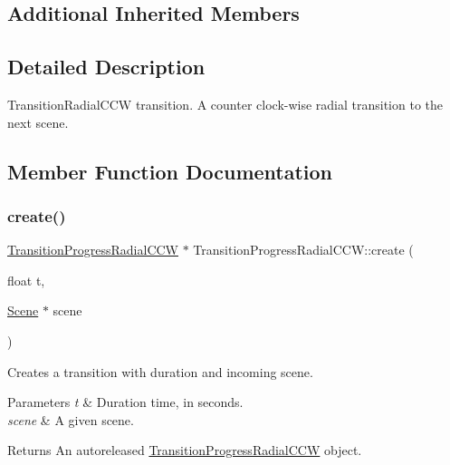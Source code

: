 \subsection*{Additional Inherited Members}


\subsection{Detailed Description}
Transition\+Radial\+C\+CW transition. A counter clock-\/wise radial transition to the next scene. 

\subsection{Member Function Documentation}
\mbox{\label{classTransitionProgressRadialCCW_a4dea77084efcbe290216b873ea93299a}} 
\subsubsection{\texorpdfstring{create()}{create()}\hspace{0.1cm}{\footnotesize\ttfamily [1/2]}}
{\footnotesize\ttfamily \hyperlink{classTransitionProgressRadialCCW}{Transition\+Progress\+Radial\+C\+CW} $\ast$ Transition\+Progress\+Radial\+C\+C\+W\+::create (\begin{DoxyParamCaption}\item[{float}]{t,  }\item[{\hyperlink{classScene}{Scene} $\ast$}]{scene }\end{DoxyParamCaption})\hspace{0.3cm}{\ttfamily [static]}}

Creates a transition with duration and incoming scene.


\begin{DoxyParams}{Parameters}
{\em t} & Duration time, in seconds. \\
\hline
{\em scene} & A given scene. \\
\hline
\end{DoxyParams}
\begin{DoxyReturn}{Returns}
An autoreleased \hyperlink{classTransitionProgressRadialCCW}{Transition\+Progress\+Radial\+C\+CW} object. 
\end{DoxyReturn}
\mbox{\label{classTransitionProgressRadialCCW_affe08c019a3332d4e47753fea7492f25}} 
